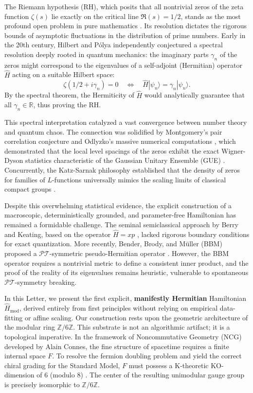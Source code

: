 \documentclass[prl,aps,floatfix,superscriptaddress,10pt]{revtex4-2}
\newcommand{\Zmod}{\mathbb{Z}/6\mathbb{Z}}
\begin{document}
The Riemann hypothesis (RH), which posits that all nontrivial zeros of the zeta function $\zeta(s)$ lie exactly on the critical line $\Re(s) = 1/2$, stands as the most profound open problem in pure mathematics \cite{Riemann1859}. Its resolution dictates the rigorous bounds of asymptotic fluctuations in the distribution of prime numbers. Early in the 20th century, Hilbert and P\'olya independently conjectured a spectral resolution deeply rooted in quantum mechanics: the imaginary parts $\gamma_n$ of the zeros might correspond to the eigenvalues of a self-adjoint (Hermitian) operator $\hat{H}$ acting on a suitable Hilbert space:
\begin{equation}
\zeta(1/2 + i\gamma_n) = 0 \quad \Longleftrightarrow \quad \hat{H}|\psi_n\rangle = \gamma_n |\psi_n\rangle.
\end{equation}
By the spectral theorem, the Hermiticity of $\hat{H}$ would analytically guarantee that all $\gamma_n \in \mathbb{R}$, thus proving the RH.

This spectral interpretation catalyzed a vast convergence between number theory and quantum chaos. The connection was solidified by Montgomery's pair correlation conjecture \cite{Montgomery1973} and Odlyzko's massive numerical computations \cite{Odlyzko2001}, which demonstrated that the local level spacings of the zeros exhibit the exact Wigner-Dyson statistics characteristic of the Gaussian Unitary Ensemble (GUE) \cite{Bohigas1984}. Concurrently, the Katz-Sarnak philosophy established that the density of zeros for families of $L$-functions universally mimics the scaling limits of classical compact groups \cite{KatzSarnak1999}.

Despite this overwhelming statistical evidence, the explicit construction of a macroscopic, deterministically grounded, and parameter-free Hamiltonian has remained a formidable challenge. The seminal semiclassical approach by Berry and Keating, based on the operator $\hat{H} = xp$ \cite{BerryKeating1999}, lacked rigorous boundary conditions for exact quantization. More recently, Bender, Brody, and M\"uller (BBM) proposed a $\mathcal{PT}$-symmetric pseudo-Hermitian operator \cite{Bender2017}. However, the BBM operator requires a nontrivial metric to define a consistent inner product, and the proof of the reality of its eigenvalues remains heuristic, vulnerable to spontaneous $\mathcal{PT}$-symmetry breaking.

In this Letter, we present the first explicit, \textbf{manifestly Hermitian} Hamiltonian $\hat{H}_{\text{mod}}$, derived entirely from first principles without relying on empirical data-fitting or affine scaling. Our construction rests upon the geometric architecture of the modular ring $\mathbb{Z}/6\mathbb{Z}$. This substrate is not an algorithmic artifact; it is a topological imperative. In the framework of Noncommutative Geometry (NCG) developed by Alain Connes, the fine structure of spacetime requires a finite internal space $F$. To resolve the fermion doubling problem and yield the correct chiral grading for the Standard Model, $F$ must possess a K-theoretic KO-dimension of 6 (modulo 8) \cite{Connes2008, Chamseddine2007}. The center of the resulting unimodular gauge group is precisely isomorphic to $\Zmod$. 
\end{document}
